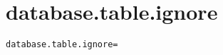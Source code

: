 \section{database.table.ignore}
\label{configuration:DatabaseTableIgnore}
\AvailableInJavaOnly{\TODO}
\begin{lstlisting}[style=Props,caption={Usage example for \textit{database.table.ignore}}]
database.table.ignore=
\end{lstlisting}